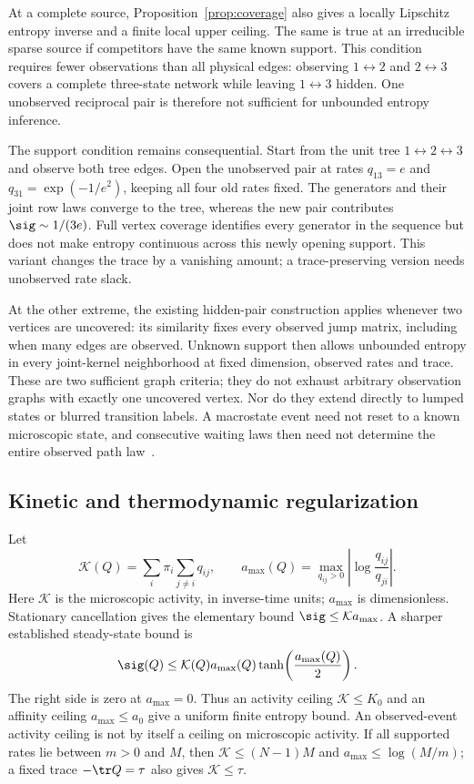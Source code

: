 At a complete source, Proposition~\ref{prop:coverage} also gives a locally
Lipschitz entropy inverse and a finite local upper ceiling. The same is
true at an irreducible sparse source if competitors have the same known
support. This condition requires fewer observations than all physical
edges: observing $1\leftrightarrow2$ and $2\leftrightarrow3$ covers a
complete three-state network while leaving $1\leftrightarrow3$ hidden.
One unobserved reciprocal pair is therefore not sufficient for unbounded
entropy inference.

The support condition remains consequential. Start from the unit tree
$1\leftrightarrow2\leftrightarrow3$ and observe both tree edges. Open
the unobserved pair at rates $q_{13}=e$ and
$q_{31}=\exp(-1/e^2)$, keeping all four old rates fixed. The generators
and their joint row laws converge to the tree, whereas the new pair
contributes $\sig\sim1/(3e)$. Full vertex coverage identifies every
generator in the sequence but does not make entropy continuous across
this newly opening support. This variant changes the trace by a
vanishing amount; a trace-preserving version needs unobserved rate slack.

At the other extreme, the existing hidden-pair construction applies
whenever two vertices are uncovered: its similarity fixes every observed
jump matrix, including when many edges are observed. Unknown support
then allows unbounded entropy in every joint-kernel neighborhood at fixed
dimension, observed rates and trace. These are two sufficient graph
criteria; they do not exhaust arbitrary observation graphs with exactly
one uncovered vertex. Nor do they extend directly to lumped states or
blurred transition labels. A macrostate event need not reset to a known
microscopic state, and consecutive waiting laws then need not determine
the entire observed path law~\cite{SkinnerDunkel2021PNAS,Bruno2005,FritzSeifert2026}.

\subsection{Kinetic and thermodynamic regularization}
Let
\begin{equation}
 \mathcal K(Q)=\sum_i\pi_i\sum_{j\ne i}q_{ij},\qquad
 a_{\max}(Q)=\max_{q_{ij}>0}\left|\log\frac{q_{ij}}{q_{ji}}\right|.
\end{equation}
Here $\mathcal K$ is the microscopic activity, in inverse-time units;
$a_{\max}$ is dimensionless. Stationary cancellation gives the elementary
bound $\sig\le\mathcal K a_{\max}$. A sharper established steady-state
bound is~\cite{NishiyamaHasegawa2023}
\begin{equation}
 \sig(Q)\le\mathcal K(Q)a_{\max}(Q)
           \tanh\!\left(\frac{a_{\max}(Q)}2\right).\label{eq:sharpprior}
\end{equation}
The right side is zero at $a_{\max}=0$. Thus an activity ceiling
$\mathcal K\le K_0$ and an affinity ceiling $a_{\max}\le a_0$ give a
uniform finite entropy bound. An observed-event activity ceiling is not
by itself a ceiling on microscopic activity. If all supported rates lie
between $m>0$ and $M$, then
$\mathcal K\le(N-1)M$ and $a_{\max}\le\log(M/m)$; a fixed trace
$-\tr Q=\tau$ also gives $\mathcal K\le\tau$.

